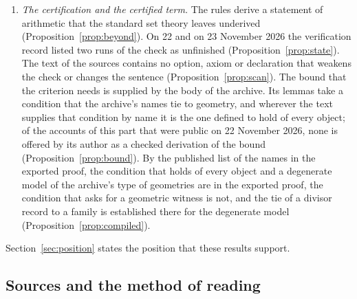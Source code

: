 \documentclass[11pt]{article}
\theoremstyle{definition}
\theoremstyle{remark}
\begin{document}
\begin{enumerate}[leftmargin=2em,itemsep=2pt]
\item \emph{The certification and the certified term.} The rules derive a statement of arithmetic that the standard set theory leaves underived (Proposition~\ref{prop:beyond}). On 22 and on 23 November 2026 the verification record listed two runs of the check as unfinished (Proposition~\ref{prop:state}). The text of the sources contains no option, axiom or declaration that weakens the check or changes the sentence (Proposition~\ref{prop:scan}). The bound that the criterion needs is supplied by the body of the archive. Its lemmas take a condition that the archive's names tie to geometry, and wherever the text supplies that condition by name it is the one defined to hold of every object; of the accounts of this part that were public on 22 November 2026, none is offered by its author as a checked derivation of the bound (Proposition~\ref{prop:bound}). By the published list of the names in the exported proof, the condition that holds of every object and a degenerate model of the archive's type of geometries are in the exported proof, the condition that asks for a geometric witness is not, and the tie of a divisor record to a family is established there for the degenerate model (Proposition~\ref{prop:compiled}).
\end{enumerate}

\noindent Section~\ref{sec:position} states the position that these results support.


\subsection{Sources and the method of reading}\label{sec:method}
\end{document}
